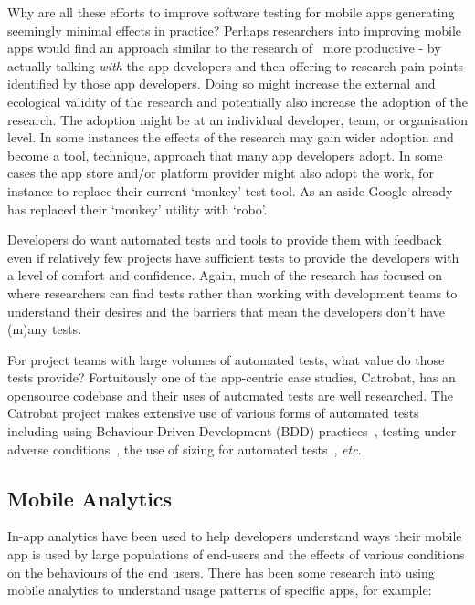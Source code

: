 Why are all these efforts to improve software testing for mobile apps generating seemingly minimal effects in practice? Perhaps researchers into improving mobile apps would find an approach similar to the research of~\citet{winter2022_lets_talk_with_developers_etc_automatic_program_repair} more productive - by actually talking \emph{with} the app developers and then offering to research pain points identified by those app developers. Doing so might increase the external and ecological validity of the research and potentially also increase the adoption of the research. The adoption might be at an individual developer, team, or organisation level. In some instances the effects of the research may gain wider adoption and become a tool, technique, approach that many app developers adopt. In some cases the app store and/or platform provider might also adopt the work, for instance to replace their current `monkey' test tool. As an aside Google already has replaced their `monkey' utility with `robo'.

Developers do want automated tests and tools to provide them with feedback~\citep[p. 5]{greiler2022_an_actionable_framework_for_understanding_and_improving_developer_experience} even if relatively few projects have sufficient tests to provide the developers with a level of comfort and confidence. Again, much of the research has focused on where researchers can find tests rather than working with development teams to understand their desires and the barriers that mean the developers don't have (m)any tests. 

For project teams with large volumes of automated tests, what value do those tests provide? Fortuitously one of the app-centric case studies, Catrobat, has an opensource codebase and their uses of automated tests are well researched. The Catrobat project makes extensive use of various forms of automated tests including using Behaviour-Driven-Development (BDD) practices~\citet{ali2019using_catrobat}, testing under adverse conditions~\citet{adamsen2015systematic_catrobat}, the use of sizing for automated tests~\citet{hirsch2019approach_catrobat}, \emph{etc}. %

\subsection{Mobile Analytics}
In-app analytics have been used to help developers understand ways their mobile app is used by large populations of end-users and the effects of various conditions on the behaviours of the end users. There has been some research into using mobile analytics to understand usage patterns of specific apps, for example:

